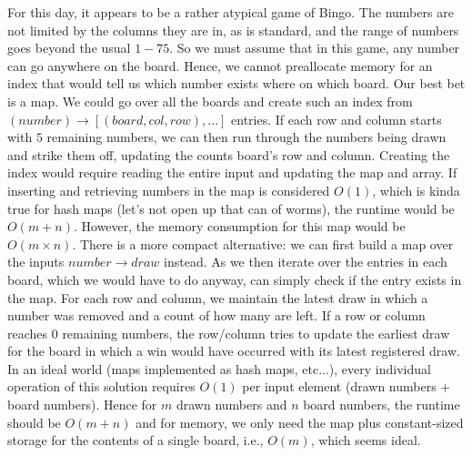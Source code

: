For this day, it appears to be a rather atypical game of Bingo. The numbers are not limited by the columns they are in, as is standard, and the range of numbers goes beyond the usual $1-75$. So we must assume that in this game, any number can go anywhere on the board. Hence, we cannot preallocate memory for an index that would tell us which number exists where on which board. Our best bet is a map. We could go over all the boards and create such an index from $(number) \rightarrow [(board, col, row), ...]$ entries. If each row and column starts with $5$ remaining numbers, we can then run through the numbers being drawn and strike them off, updating the counts board's row and column. Creating the index would require reading the entire input and updating the map and array. If inserting and retrieving numbers in the map is considered $O(1)$, which is kinda true for hash maps (let's not open up that can of worms), the runtime would be $O(m + n)$. However, the memory consumption for this map would be $O(m \times n)$. There is a more compact alternative: we can first build a map over the inputs $number \rightarrow draw$ instead. As we then iterate over the entries in each board, which we would have to do anyway, can simply check if the entry exists in the map. For each row and column, we maintain the latest draw in which a number was removed and a count of how many are left. If a row or column reaches $0$ remaining numbers, the row/column tries to update the earliest draw for the board in which a win would have occurred with its latest registered draw. In an ideal world (maps implemented as hash maps, etc...), every individual operation of this solution requires $O(1)$ per input element (drawn numbers + board numbers). Hence for $m$ drawn numbers and $n$ board numbers, the runtime should be $O(m + n)$ and for memory, we only need the map plus constant-sized storage for the contents of a single board, i.e., $O(m)$, which seems ideal. 